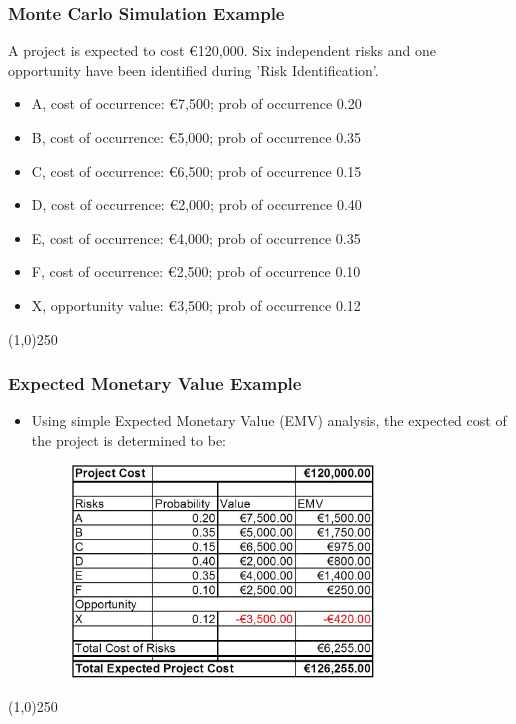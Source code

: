 \begin{frame}
\frametitle{Monte Carlo Simulation Example}
	A project is expected to cost \euro120,000.  Six independent risks and one opportunity have been identified during 'Risk Identification'.
\begin{itemize}
\item A, cost of occurrence: \euro7,500; prob of occurrence 0.20  
\item B, cost of occurrence: \euro5,000; prob of occurrence 0.35 
\item C, cost of occurrence: \euro6,500; prob of occurrence 0.15 
\item D, cost of occurrence: \euro2,000; prob of occurrence 0.40 
\item E, cost of occurrence: \euro4,000; prob of occurrence 0.35
\item F, cost of occurrence: \euro2,500; prob of occurrence 0.10 
\item X, opportunity value: \euro3,500; prob of occurrence 0.12 
\end{itemize}
\end{frame}\begin{center}\line(1,0){250}\end{center}


\begin{frame}
\frametitle{Expected Monetary Value Example}
\begin{itemize}
\item Using simple Expected Monetary Value (EMV) analysis, the expected cost of the project is determined to be: 
\begin{figure}
	\centering
		\includegraphics[width = 8cm]{images/evm1.jpg}
	\label{fig:evm}
\end{figure}
\end{itemize}
\end{frame}\begin{center}\line(1,0){250}\end{center}



